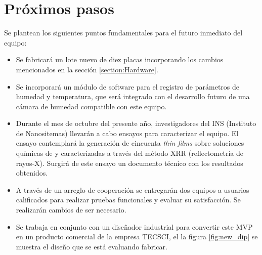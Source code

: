 \section{Próximos pasos}

Se plantean los siguientes puntos fundamentales para el futuro inmediato del equipo:  

\begin{itemize}

\item Se fabricará un lote nuevo de diez placas incorporando los cambios mencionados en la sección \ref{section:Hardware}. 

\item Se incorporará un módulo de software para el registro de parámetros de humedad y temperatura, que será integrado con el desarrollo futuro de una cámara de humedad compatible con este equipo.

\item Durante el mes de octubre del presente año, investigadores del INS (Instituto de Nanositemas) llevarán a cabo ensayos para caracterizar el equipo. El ensayo contemplará la generación de cincuenta \textit{thin films} sobre soluciones químicas de  y  caracterizadas a través del método XRR (reflectometría de rayos-X). Surgirá de este ensayo un documento técnico con los resultados obtenidos.  
 
\item A través de un arreglo de cooperación se entregarán dos equipos a usuarios calificados para realizar pruebas funcionales y evaluar su satisfacción. Se realizarán cambios de ser necesario.


\item Se trabaja en conjunto con un diseñador industrial para convertir este MVP en un producto comercial de la empresa TECSCI, el la figura \ref{fig:new_dip} se muestra el diseño que se está evaluando fabricar.



\end{itemize}
